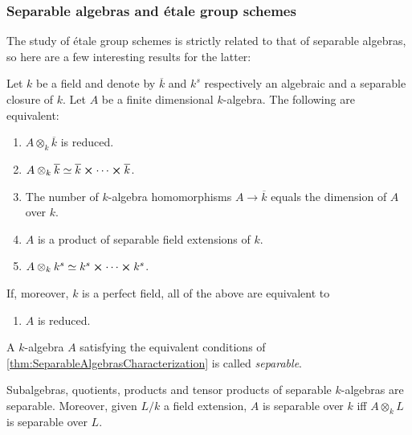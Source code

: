 \subsubsection{Separable algebras and étale group schemes}
The study of étale group schemes is strictly related to that of
separable algebras, so here are a few interesting results for the latter:


\begin{thm}
	\label{thm:SeparableAlgebrasCharacterization}
	Let $k$ be a field and denote by $\overline{k}$ and $k^s$ respectively
	an algebraic and a separable closure of $k$.
	Let $A$ be a finite dimensional $k$-algebra.
	The following are equivalent:
\begin{enumerate}
	\item $A \otimes_k \overline{k}$ is reduced.
	\item $A \otimes_k \overline{k} \simeq \overline{k} \cross \cdots \cross \overline{k}$.
	\item The number of $k$-algebra homomorphisms $A \to  \overline{k}$
		equals the dimension of $A$ over $k$.
	\item $A$ is a product of separable field extensions of $k$.
	\item $A \otimes_k k^s \simeq k^s \cross \cdots \cross k^s$.
\end{enumerate}
If, moreover, $k$ is a perfect field, all of the above are equivalent to
\begin{enumerate}[resume]
	\item $A$ is reduced.
\end{enumerate}
\end{thm}


\begin{defn}
	A $k$-algebra $A$ satisfying the equivalent conditions of
	\cref{thm:SeparableAlgebrasCharacterization}
	is called {\em separable}.
\end{defn}


\begin{cor}
	Subalgebras, quotients, products and tensor products of separable $k$-algebras
	are separable.
	Moreover, given $L/k$ a field extension, $A$ is separable over $k$
	iff $A \otimes_k L$ is separable over $L$.
\end{cor} 


